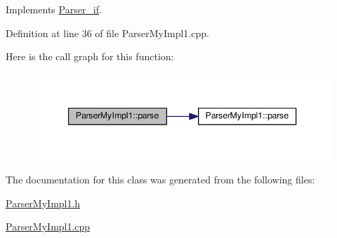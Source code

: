 Implements \hyperlink{class_parser__if_af163b0c5b081ccfa2ba04267cd4741b1}{Parser\-\_\-if}.



Definition at line 36 of file Parser\-My\-Impl1.\-cpp.



Here is the call graph for this function\-:\nopagebreak
\begin{figure}[H]
\begin{center}
\leavevmode
\includegraphics[width=344pt]{class_parser_my_impl1_a16e3fabb410b9b7aa73050e25a89c49b_cgraph}
\end{center}
\end{figure}




The documentation for this class was generated from the following files\-:\begin{DoxyCompactItemize}
\item 
\hyperlink{_parser_my_impl1_8h}{Parser\-My\-Impl1.\-h}\item 
\hyperlink{_parser_my_impl1_8cpp}{Parser\-My\-Impl1.\-cpp}\end{DoxyCompactItemize}

